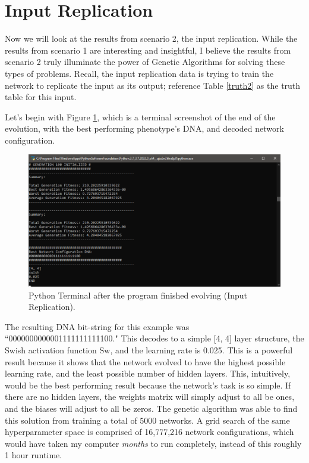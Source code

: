 \documentclass[12pt]{report}
\begin{document}
\section{Input Replication}
Now we will look at the results from scenario 2, the input replication. While the results from scenario 1 are interesting and insightful, I believe the results from scenario 2 truly illuminate the power of Genetic Algorithms for solving these types of problems. Recall, the input replication data is trying to train the network to replicate the input as its output; reference Table \ref{truth2} as the truth table for this input.

Let's begin with Figure \ref{replicationend}, which is a terminal screenshot of the end of the evolution, with the best performing phenotype's DNA, and decoded network configuration.

\begin{figure}[hbt!]
    \centering
    \includegraphics[width=5in]{figures/replicationend.png}
    \caption{Python Terminal after the program finished evolving (Input Replication).}
    \label{replicationend}
\end{figure}

 The resulting DNA bit-string for this example was ``0000000000001111111111100." This decodes to a simple [4, 4] layer structure, the Swish activation function $\text{Sw}$, and the learning rate is 0.025. This is a powerful result because it shows that the network evolved to have the highest possible learning rate, and the least possible number of hidden layers. This, intuitively, would be the best performing result because the network's task is so simple. If there are no hidden layers, the weights matrix will simply adjust to all be ones, and the biases will adjust to all be zeros. The genetic algorithm was able to find this solution from training a total of 5000 networks. A grid search of the same hyperparameter space is comprised of 16,777,216 network configurations, which would have taken my computer \emph{months} to run completely, instead of this roughly 1 hour runtime.
\end{document}

